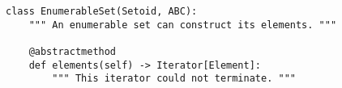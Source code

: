 \par\begin{minipage}{60ex}
\begin{verbatim}
class EnumerableSet(Setoid, ABC):
    """ An enumerable set can construct its elements. """

    @abstractmethod
    def elements(self) -> Iterator[Element]:
        """ This iterator could not terminate. """
\end{verbatim}
\end{minipage}\par